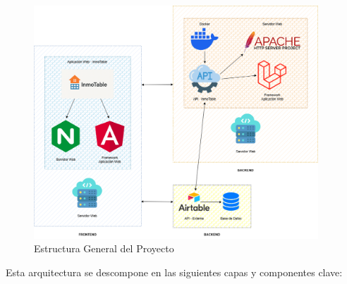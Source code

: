 \begin{figure}[H]
    \begin{center}
        \includegraphics[width = 0.95\textwidth]{Figuras/estructura-general-aplicacion.png}
    \end{center}
    \caption{\label{fig:estructura-general-aplicacion} Estructura General del Proyecto}
\end{figure}

Esta arquitectura se descompone en las siguientes capas y componentes clave:


